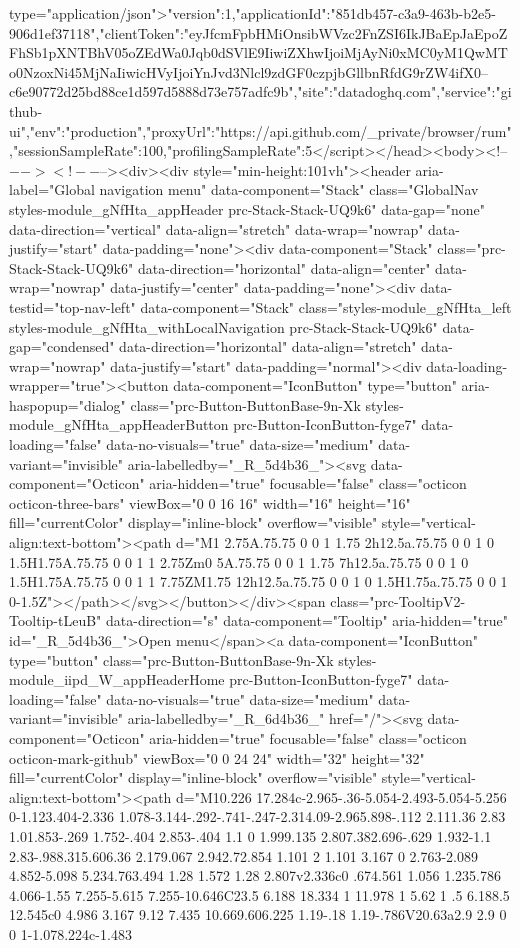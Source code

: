 type="application/json">{"version":1,"applicationId":"851db457-c3a9-463b-b2e5-906d1ef37118","clientToken":"eyJfcmFpbHMiOnsibWVzc2FnZSI6IkJBaEpJaEpoZFhSb1pXNTBhV05oZEdWa0Jqb0dSVlE9IiwiZXhwIjoiMjAyNi0xMC0yM1QwMTo0NzoxNi45MjNaIiwicHVyIjoiYnJvd3Nlcl9zdGF0czpjbGllbnRfdG9rZW4ifX0--c6e90772d25bd88ce1d597d5888d73e757adfc9b","site":"datadoghq.com","service":"github-ui","env":"production","proxyUrl":"https://api.github.com/_private/browser/rum","sessionSampleRate":100,"profilingSampleRate":5}</script></head><body><!--$--><!--$--><div><div style="min-height:101vh"><header aria-label="Global navigation menu" data-component="Stack" class="GlobalNav styles-module_gNfHta_appHeader prc-Stack-Stack-UQ9k6" data-gap="none" data-direction="vertical" data-align="stretch" data-wrap="nowrap" data-justify="start" data-padding="none"><div data-component="Stack" class="prc-Stack-Stack-UQ9k6" data-direction="horizontal" data-align="center" data-wrap="nowrap" data-justify="center" data-padding="none"><div data-testid="top-nav-left" data-component="Stack" class="styles-module_gNfHta_left styles-module_gNfHta_withLocalNavigation prc-Stack-Stack-UQ9k6" data-gap="condensed" data-direction="horizontal" data-align="stretch" data-wrap="nowrap" data-justify="start" data-padding="normal"><div data-loading-wrapper="true"><button data-component="IconButton" type="button" aria-haspopup="dialog" class="prc-Button-ButtonBase-9n-Xk styles-module_gNfHta_appHeaderButton prc-Button-IconButton-fyge7" data-loading="false" data-no-visuals="true" data-size="medium" data-variant="invisible" aria-labelledby="_R_5d4b36_"><svg data-component="Octicon" aria-hidden="true" focusable="false" class="octicon octicon-three-bars" viewBox="0 0 16 16" width="16" height="16" fill="currentColor" display="inline-block" overflow="visible" style="vertical-align:text-bottom"><path d="M1 2.75A.75.75 0 0 1 1.75 2h12.5a.75.75 0 0 1 0 1.5H1.75A.75.75 0 0 1 1 2.75Zm0 5A.75.75 0 0 1 1.75 7h12.5a.75.75 0 0 1 0 1.5H1.75A.75.75 0 0 1 1 7.75ZM1.75 12h12.5a.75.75 0 0 1 0 1.5H1.75a.75.75 0 0 1 0-1.5Z"></path></svg></button></div><span class="prc-TooltipV2-Tooltip-tLeuB" data-direction="s" data-component="Tooltip" aria-hidden="true" id="_R_5d4b36_">Open menu</span><a data-component="IconButton" type="button" class="prc-Button-ButtonBase-9n-Xk styles-module_iipd_W_appHeaderHome prc-Button-IconButton-fyge7" data-loading="false" data-no-visuals="true" data-size="medium" data-variant="invisible" aria-labelledby="_R_6d4b36_" href="/"><svg data-component="Octicon" aria-hidden="true" focusable="false" class="octicon octicon-mark-github" viewBox="0 0 24 24" width="32" height="32" fill="currentColor" display="inline-block" overflow="visible" style="vertical-align:text-bottom"><path d="M10.226 17.284c-2.965-.36-5.054-2.493-5.054-5.256 0-1.123.404-2.336 1.078-3.144-.292-.741-.247-2.314.09-2.965.898-.112 2.111.36 2.83 1.01.853-.269 1.752-.404 2.853-.404 1.1 0 1.999.135 2.807.382.696-.629 1.932-1.1 2.83-.988.315.606.36 2.179.067 2.942.72.854 1.101 2 1.101 3.167 0 2.763-2.089 4.852-5.098 5.234.763.494 1.28 1.572 1.28 2.807v2.336c0 .674.561 1.056 1.235.786 4.066-1.55 7.255-5.615 7.255-10.646C23.5 6.188 18.334 1 11.978 1 5.62 1 .5 6.188.5 12.545c0 4.986 3.167 9.12 7.435 10.669.606.225 1.19-.18 1.19-.786V20.63a2.9 2.9 0 0 1-1.078.224c-1.483 